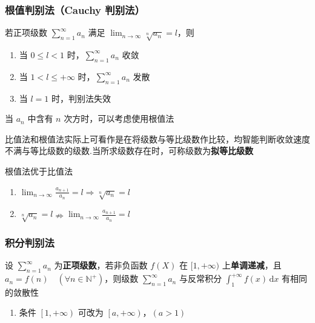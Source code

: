 \documentclass[lang = zh , final , oneside , openany , titlepage , zihao = -4 , linespread = 1.3 , baselineskip = false , cjk-font = windows , text-font = newtx , math-font = newtx , math-style = TeX]{sjtureport}
\begin{document}
\subsubsection{根值判别法（Cauchy 判别法）}

\begin{theorem}
若正项级数 \(\displaystyle \sum_{n=1}^\infty a_n\) 满足
\(\displaystyle \lim_{n\to\infty} \sqrt[n]{a_n} = l\)，则

\begin{enumerate}
\def\labelenumi{\arabic{enumi}.}
\item
  当 \(0\leq l<1\) 时，\(\displaystyle \sum_{n=1}^\infty a_n\) 收敛
\item
  当 \(1 < l \leq +\infty\) 时，\(\displaystyle \sum_{n=1}^\infty a_n\)
  发散
\item
  当 \(l=1\) 时，判别法失效
\end{enumerate}
\end{theorem}

\begin{remark}
    当 \(a_n\) 中含有 \(n\) 次方时，可以考虑使用根值法
\end{remark}

\begin{remark}
    比值法和根值法实际上可看作是在将级数与等比级数作比较，均智能判断收敛速度不满与等比级数的级数.当所求级数存在时，可称级数为\textbf{拟等比级数}
\end{remark}

\begin{remark}
    根值法优于比值法
    \begin{enumerate}
\item
  \(\displaystyle\lim_{n\to\infty}\frac{a_{n+1}}{a_n} =  l \Rightarrow \displaystyle \sqrt[n]{a_n} = l\)
\item
  \(\displaystyle \sqrt[n]{a_n} =l \nRightarrow \displaystyle\lim_{n\to\infty}\frac{a_{n+1}}{a_n} =  l\)
\end{enumerate}
\end{remark}

\subsubsection{积分判别法}

\begin{definition}
    设 \(\displaystyle \sum_{n=1}^\infty a_n\)
为\textbf{正项级数}，若非负函数 \(f(X)\) 在 \([1,+\infty)\)
上\textbf{单调递减}，且
\(a_n = f(n)\quad \left(\forall n \in \mathbb{N}^+\right)\)，则级数
\(\displaystyle \sum_{n=1}^\infty a_n\) 与反常积分
\(\displaystyle \int_1^{+\infty} f(x)\,\mathrm{d}x\) 有相同的敛散性

\begin{enumerate}
\item
  条件 \(\left[1,+\infty\right)\) 可改为
  \(\left[a,+\infty\right)，(a>1)\)
\end{enumerate}
\end{definition}
\end{document}
